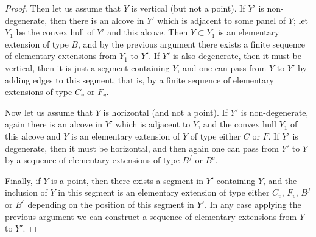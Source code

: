 \documentclass[10pt,a4paper]{amsart}
\begin{document}
\begin{proof}
Then let us assume that $Y$ is vertical (but not a point). If $Y'$ is non-degenerate, then there is an alcove in $Y'$ which is adjacent to some panel of $Y$; let $Y_1$ be the convex hull of $Y'$ and this alcove. Then $Y\subset Y_1$ is an elementary extension of type $B$, and by the previous argument there exists a finite sequence of elementary extensions from $Y_1$ to $Y'$.
If $Y'$ is also degenerate, then it must be vertical, then it is just a segment containing $Y$, and one can pass from $Y$ to $Y'$ by adding edges to this segment, that is, by a finite sequence of elementary extensions of type $C_v$ or $F_v$.

Now let us assume that $Y$ is horizontal (and not a point). If $Y'$ is non-degenerate, again there is an alcove in $Y'$ which is adjacent to $Y$, and the convex hull $Y_1$ of this alcove and $Y$ is an elementary extension of $Y$ of type either $C$ or $F$.  If $Y'$ is degenerate, then it must be horizontal, and then again one can pass from $Y'$ to $Y$ by a sequence of elementary extensions of type $B^f$ or $B^c$.

Finally, if $Y$ is a point, then there exists a segment in $Y'$ containing $Y$, and  the inclusion of $Y$ in this segment is
an elementary extension of type either $C_v$, $F_v$, $B^f$ or $B^c$ depending on the position of this segment in $Y'$. In any case applying the previous argument we can construct a sequence of elementary extensions from $Y$ to $Y'$.
\end{proof}
\end{document}
